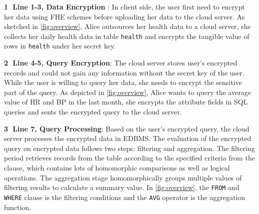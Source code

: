 \textbf{\textcircled{1} Line 1-3, Data Encryption }: In client side, the user first 
need to encrypt her data     using FHE schemes before uploading her data to 
the cloud server. 
As sketched in \cref{fig:overview}, Alice outsources her health data 
to a cloud server, 
she collects her daily health data 
in table \texttt{health} and encrypts the tangible value of rows 
in \texttt{health} under her secret key.
\begin{algorithm}[htbp]
    \caption{Homomorphic Table Encryption Algorithm}
    \label{algo: query_evaluation}
    
\end{algorithm}

\textbf{\textcircled{2} Line 4-5, Query Encryption}: The cloud server stores 
user's encrypted records and could not gain any information without 
the secret key of the user. 
While the user is willing to query her data, 
she needs to encrypt the sensitive part of the query. 
As depicted  in \cref{fig:overview}, 
Alice wants to query the average value of HR and BP in the last month,
she encrypts the attribute fields in SQL queries and sents the 
encrypted query to the cloud server.

\textbf{\textcircled{3} Line 7, Query Processing}: Based on the user's encrypted query, 
the cloud server processes the encrypted data in EDBMS.
The evaluation of the encrypted query on encrypted data follows two steps: 
filtering and aggregation. 
The filtering period retrieves records from the table 
according to the specified criteria from the clause,
which contains lots of homomorphic comparisons as well as logical operations.
The aggregation stage homomorphically groups multiple values of 
filtering results to 
calculate a summary value. 
In \cref{fig:overview}, the \texttt{FROM} and \texttt{WHERE} clause
is the filtering conditions and the 
\texttt{AVG} operator is the aggregation function.

